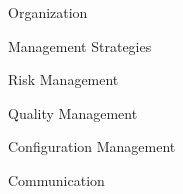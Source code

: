 \documentclass{matthijs}
\begin{document}
	\begin{hoofdstuk}{Organization}

	\end{hoofdstuk}

	\begin{hoofdstuk}{Management Strategies}

		\begin{paragraaf}{Risk Management}

		\end{paragraaf}
		
		\begin{paragraaf}{Quality Management}

		\end{paragraaf}

		\begin{paragraaf}{Configuration Management}

		\end{paragraaf}

		\begin{paragraaf}{Communication}

		\end{paragraaf}

	\end{hoofdstuk}
\end{document}
